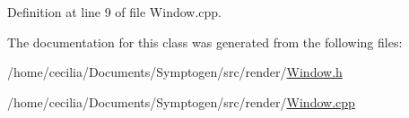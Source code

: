 Definition at line 9 of file Window.\-cpp.



The documentation for this class was generated from the following files\-:\begin{DoxyCompactItemize}
\item 
/home/cecilia/\-Documents/\-Symptogen/src/render/\hyperlink{_window_8h}{Window.\-h}\item 
/home/cecilia/\-Documents/\-Symptogen/src/render/\hyperlink{_window_8cpp}{Window.\-cpp}\end{DoxyCompactItemize}
